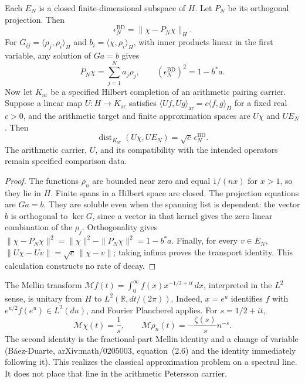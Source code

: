 \begin{proposition}
\label{v4-arith:hpvbconv:prop:VBstar-BD-rate}
Each \(E_N\) is a closed finite-dimensional subspace of \(H\).
Let \(P_N\) be its orthogonal projection. Then
\[
 \epsilon_N^{\mathrm{BD}}=\|\chi-P_N\chi\|_H.
\]
For \(G_{ij}=\langle\rho_j,\rho_i\rangle_H\) and
\(b_i=\langle\chi,\rho_i\rangle_H\), with inner products linear in
the first variable, any solution of \(Ga=b\) gives
\[
 P_N\chi=\sum_{j=1}^N a_j\rho_j,\qquad
 (\epsilon_N^{\mathrm{BD}})^2=1-b^*a.
\]
Now let \(K_{\mathrm{ar}}\) be a specified Hilbert completion of an
arithmetic pairing carrier. Suppose a linear map
\(U:H\to K_{\mathrm{ar}}\) satisfies
\(\langle Uf,Ug\rangle_{\mathrm{ar}}=c\langle f,g\rangle_H\)
for a fixed real \(c>0\), and the arithmetic target and finite
approximation spaces are \(U\chi\) and \(UE_N\). Then
\[
 \operatorname{dist}_{K_{\mathrm{ar}}}(U\chi,UE_N)
 =\sqrt c\,\epsilon_N^{\mathrm{BD}}.
\]
The arithmetic carrier, \(U\), and its compatibility with the
intended operators remain specified comparison data.
\end{proposition}
\begin{proof}
The functions \(\rho_n\) are bounded near zero and equal
\(1/(nx)\) for \(x>1\), so they lie in \(H\). Finite spans in a
Hilbert space are closed. The projection equations are \(Ga=b\).
They are soluble even when the spanning list is dependent: the
vector \(b\) is orthogonal to \(\ker G\), since a vector in that
kernel gives the zero linear combination of the \(\rho_j\).
Orthogonality gives
\(\|\chi-P_N\chi\|^2=\|\chi\|^2-\|P_N\chi\|^2=1-b^*a\).
Finally, for every \(v\in E_N\),
\(\|U\chi-Uv\|=\sqrt c\,\|\chi-v\|\); taking infima proves the
transport identity. This calculation constructs no rate of decay.
\end{proof}

\begin{remark}
The Mellin transform
\(\mathcal Mf(t)=\int_0^\infty f(x)x^{-1/2+it}\,dx\), interpreted
in the \(L^2\) sense, is unitary from \(H\) to
\(L^2(\mathbb R,dt/(2\pi))\). Indeed, \(x=e^u\) identifies
\(f\) with \(e^{u/2}f(e^u)\in L^2(du)\), and Fourier Plancherel
applies. For \(s=1/2+it\),
\[
 \mathcal M\chi(t)=\frac1s,\qquad
 \mathcal M\rho_n(t)=-\frac{\zeta(s)}{s}n^{-s}.
\]
The second identity is the fractional-part Mellin identity and a
change of variable (B\'aez-Duarte, arXiv:math/0205003, equation~(2.6)
and the identity immediately following it). This realizes the
classical approximation problem on a spectral line. It does not
place that line in the arithmetic Petersson carrier.
\end{remark}

